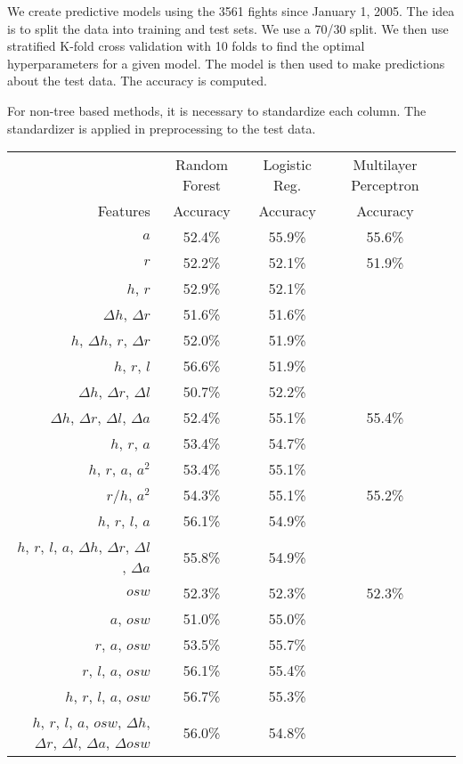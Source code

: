 We create predictive models using the 3561 fights since
January 1, 2005. The idea is to split the data into
training and test sets. We use a 70/30 split. We then
use stratified K-fold cross validation with 10 folds
to find the optimal
hyperparameters for a given model. The model is then
used to make predictions about the test data. The accuracy
is computed.

For non-tree based methods, it is necessary to standardize
each column. The standardizer is applied in preprocessing to
the test data.


\begin{center}
\begin{table}[h]
\begin{tabular}{r|cccc}
  \toprule
   & Random Forest & Logistic Reg. & Multilayer Perceptron \\
  Features & Accuracy & Accuracy& Accuracy \\
  \hline
  $a$ & 52.4\% & 55.9\% & 55.6\%\\
  $r$ & 52.2\% & 52.1\% & 51.9\%\\
  $h$, $r$ & 52.9\%  & 52.1\% & \\
  $\Delta h$, $\Delta r$ & 51.6\% & 51.6\%  &\\
  $h$, $\Delta h$, $r$, $\Delta r$ & 52.0\% & 51.9\%  &\\
  $h$, $r$, $l$ & 56.6\% & 51.9\% &  \\
  $\Delta h$, $\Delta r$, $\Delta l$ & 50.7\% & 52.2\%  &\\
  $\Delta h$, $\Delta r$, $\Delta l$, $\Delta a$ & 52.4\% & 55.1\% & 55.4\% \\
  $h$, $r$, $a$ & 53.4\% & 54.7\% &  \\
  $h$, $r$, $a$, $a^2$ & 53.4\% & 55.1\% &  \\
  $r/h$, $a^2$ & 54.3\% & 55.1\% & 55.2\%  \\
  $h$, $r$, $l$, $a$ & 56.1\% & 54.9\% &  \\
  $h$, $r$, $l$, $a$, $\Delta h$, $\Delta r$, $\Delta l$, $\Delta a$ & 55.8\% & 54.9\%  &\\
  $osw$ & 52.3\% & 52.3\% & 52.3\%\\
  $a$, $osw$ & 51.0\% & 55.0\% & \\
  $r$, $a$, $osw$ & 53.5\% & 55.7\% &  \\
  $r$, $l$, $a$, $osw$ & 56.1\% & 55.4\% & \\
  $h$, $r$, $l$, $a$, $osw$ & 56.7\% & 55.3\% &  \\
  $h$, $r$, $l$, $a$, $osw$, $\Delta h$, $\Delta r$, $\Delta l$, $\Delta a$, $\Delta osw$ & 56.0\% & 54.8\% &  \\

\end{tabular}
\end{table}
\end{center}
